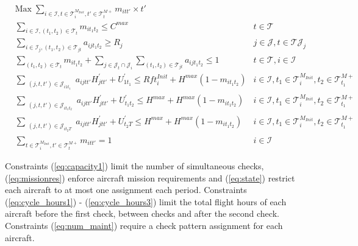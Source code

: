 \documentclass{roadef}
\begin{document}
    \begin{small}
         \begin{align}
        & \text{Max}\; 
        \sum_{
                i \in \mathcal{I}, t \in \mathcal{T}^{M_{Init}}_i, t' \in \mathcal{T}^{M+}_t
            } m_{itt'} \times t'
        \label{eq:objective1}\\
        & \sum_{i \in \mathcal{I}, (t_1, t_2) \in \mathcal{T}_{t}} m_{it_1t_2} \leq C^{max} 
                & t \in \mathcal{T} \label{eq:capacity1}\\
        & \sum_{i \in \mathcal{I}_j, (t_1, t_2) \in \mathcal{T}_{jt}} a_{ijt_1t_2} \geq R_j
                & j \in \mathcal{J}, t \in \mathcal{TJ}_j  \label{eq:missionres}\\
        & \sum_{(t_1, t_2) \in \mathcal{T}_{t}} m_{it_1t_2} + \sum_{j \in \mathcal{J}_t \cap \mathcal{J}_i} \sum_{(t_1, t_2) \in \mathcal{T}_{jt}} a_{ijt_1t_2} \leq 1 
                & t \in \mathcal{T}, i \in \mathcal{I} \label{eq:state}\\
% 
% 
        & \sum_{\substack{(j, t, t') \in  \mathcal{J}_{i1t_1}}} a_{ijtt'} H^\prime_{jtt'} + U^{\prime}_{1t_1} \leq Rft^{Init}_i + H^{max} (1 - m_{it_1t_2}) 
            & i \in \mathcal{I}, t_1 \in \mathcal{T}^{M_{Init}}_i, t_2 \in \mathcal{T}^{M+}_{t_1} \label{eq:cycle_hours1}\\
        & \sum_{\substack{(j, t, t') \in  \mathcal{J}_{it_1t_2}}} a_{ijtt'} H^\prime_{jtt'} + U^{\prime}_{t_1t_2} \leq H^{max} + H^{max} (1 - m_{it_1t_2}) 
            & i \in \mathcal{I}, t_1 \in \mathcal{T}^{M_{Init}}_i, t_2 \in \mathcal{T}^{M+}_{t_1} \label{eq:cycle_hours2}\\
        & \sum_{\substack{(j, t, t') \in  \mathcal{J}_{it_2T}}} a_{ijtt'} H^\prime_{jtt'} + U^{\prime}_{t_2T} \leq H^{max} + H^{max} (1 - m_{it_1t_2}) 
            & i \in \mathcal{I}, t_1 \in \mathcal{T}^{M_{Init}}_i, t_2 \in \mathcal{T}^{M+}_{t_1} \label{eq:cycle_hours3}\\
% 
%    
        & \sum_{t \in \mathcal{T}^{M_{Init}}_i, t' \in \mathcal{T}^{M+}_{t}} m_{itt'} =  1 
          & i \in \mathcal{I}\label{eq:num_maint}
    \end{align}
        \end{small}
    Constraints (\ref{eq:capacity1}) limit the number of simultaneous checks,  (\ref{eq:missionres}) enforce aircraft mission requirements and  (\ref{eq:state}) restrict each aircraft to at most one assignment each period.
    Constraints (\ref{eq:cycle_hours1}) - (\ref{eq:cycle_hours3}) limit the total flight hours of each aircraft before the first check, between checks and after the second check. Constraints (\ref{eq:num_maint}) require a check pattern assignment for each aircraft.
\end{document}
